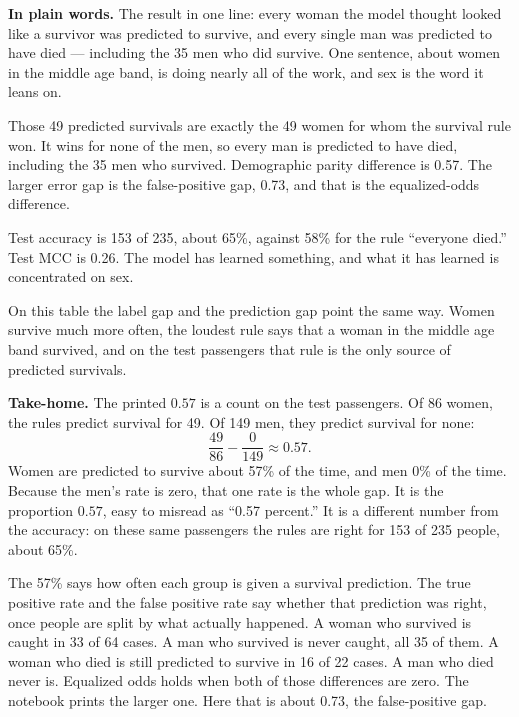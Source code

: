 \documentclass[11pt]{article}
\newcommand{\pct}[1]{\mbox{#1\%}}
\begin{document}
\begin{plainwords}
\textbf{In plain words.} The result in one line: every woman the model thought looked like a survivor was predicted to survive, and every single man was predicted to have died --- including the 35 men who did survive. One sentence, about women in the middle age band, is doing nearly all of the work, and sex is the word it leans on.
\end{plainwords}

Those 49 predicted survivals are exactly the 49 women for whom the survival rule won. It wins for none of the men, so every man is predicted to have died, including the 35 men who survived. Demographic parity difference is 0.57. The larger error gap is the false-positive gap, 0.73, and that is the equalized-odds difference.

Test accuracy is 153 of 235, about \pct{65}, against \pct{58} for the rule ``everyone died.'' Test MCC is 0.26. The model has learned something, and what it has learned is concentrated on sex.

\begin{lesson}
On this table the label gap and the prediction gap point the same way. Women survive much more often, the loudest rule says that a woman in the middle age band survived, and on the test passengers that rule is the only source of predicted survivals.
\end{lesson}

\begin{plainwords}
\textbf{Take-home.} The printed \(0.57\) is a count on the test passengers. Of 86 women, the rules predict survival for 49. Of 149 men, they predict survival for none:
\[
\frac{49}{86} - \frac{0}{149} \approx 0.57.
\]
Women are predicted to survive about \pct{57} of the time, and men \pct{0} of the time. Because the men's rate is zero, that one rate is the whole gap. It is the proportion \(0.57\), easy to misread as ``0.57 percent.'' It is a different number from the accuracy: on these same passengers the rules are right for 153 of 235 people, about \pct{65}.

The \pct{57} says how often each group is given a survival prediction. The true positive rate and the false positive rate say whether that prediction was right, once people are split by what actually happened. A woman who survived is caught in 33 of 64 cases. A man who survived is never caught, all 35 of them. A woman who died is still predicted to survive in 16 of 22 cases. A man who died never is. Equalized odds holds when both of those differences are zero. The notebook prints the larger one. Here that is about 0.73, the false-positive gap.
\end{plainwords}
\end{document}
